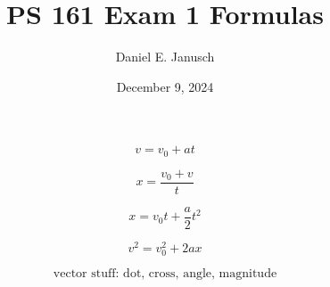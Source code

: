 \documentclass[12pt]{article}
\begin{document}

\title{PS 161 Exam 1 Formulas}
\author{Daniel E. Janusch}
\date{December 9, 2024}
\maketitle
\fi

\begin{equation}
	v = v_0 + at
\end{equation}

\begin{equation}
	x = \dfrac{v_0 + v}t
\end{equation}

\begin{equation}
	x = v_0t + \dfrac a2 t^2
\end{equation}

\begin{equation}
	v^2 = v_0^2 + 2 a x
\end{equation}

\begin{equation}
	\text{vector stuff: dot, cross, angle, magnitude}
\end{equation}

\ifx \combinedDocuments \undefined
\end{document}
